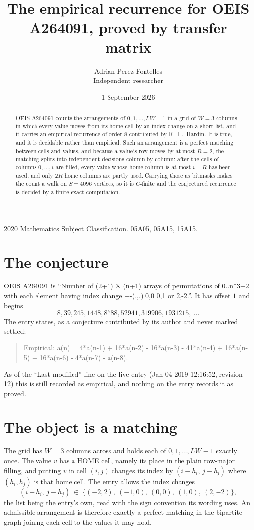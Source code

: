 \documentclass[11pt,a4paper]{article}
\title{The empirical recurrence for OEIS A264091, proved by transfer matrix}
\author{Adrian Perez Fontelles\\ \small Independent researcher}
\date{1 September 2026}
\theoremstyle{plain}
\theoremstyle{definition}
\begin{document}
\maketitle

\begin{abstract}
OEIS A264091 counts the arrangements of $0,1,\dots,LW-1$ in a grid of $W=3$ columns in which
every value moves from its home cell by an index change on a short list, and it carries an
empirical recurrence of order $8$ contributed by R.~H.~Hardin. It is true, and it is
decidable rather than empirical. Such an arrangement is a perfect matching between cells and
values, and because a value's row moves by at most $R=2$, the matching splits into
independent decisions column by column: after the cells of columns $0,\dots,i$ are filled,
every value whose home column is at most $i-R$ has been used, and only $2R$ home columns are
partly used. Carrying those as bitmasks makes the count a walk on $S=4096$ vertices, so it is
$C$-finite and the conjectured recurrence is decided by a finite exact computation.
\end{abstract}

\noindent\small 2020 Mathematics Subject Classification. 05A05, 05A15, 15A15.\normalsize

\section{The conjecture}

OEIS A264091 is ``Number of (2+1) X (n+1) arrays of permutations of 0..n*3+2 with each element having index change +-(.,.) 0,0 0,1 or 2,-2.''. It has offset $1$ and begins
\[
8, 39, 245, 1448, 8788, 52941, 319906, 1931215,\ \dots
\]
The entry states, as a conjecture contributed by its author and never marked settled:
\begin{quote}
Empirical: a(n) = 4*a(n-1) + 16*a(n-2) - 16*a(n-3) - 41*a(n-4) + 16*a(n-5) + 16*a(n-6) - 4*a(n-7) - a(n-8).
\end{quote}
As of the ``Last modified'' line on the live entry (Jan 04 2019 12:16:52, revision 12) this is still
recorded as empirical, and nothing on the entry records it as proved.

\section{The object is a matching}

The grid has $W=3$ columns across and holds each of $0,1,\dots,LW-1$ exactly once. The value
$v$ has a HOME cell, namely its place in the plain row-major filling, and putting $v$ in cell
$(i,j)$ changes its index by $(i-h_i,\,j-h_j)$ where $(h_i,h_j)$ is that home cell. The entry
allows the index changes
\[
(i-h_i,\,j-h_j)\;\in\;\{(-2,2),\ (-1,0),\ (0,0),\ (1,0),\ (2,-2)\},
\]
the list being the entry's own, read with the sign convention its wording uses. An admissible
arrangement is therefore exactly a perfect matching in the bipartite graph joining each cell to
the values it may hold.
\end{document}
